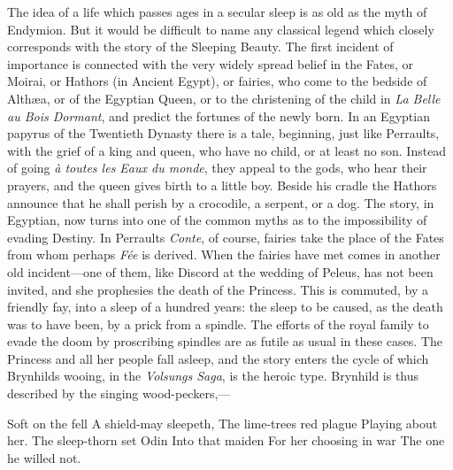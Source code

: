 \documentclass[14pt,a4paper]{memoir}
\begin{document}
{The idea of a life which passes ages in a secular sleep is as old as the
myth of Endymion. But it would be difficult to name any classical legend
which closely corresponds with the story of the Sleeping Beauty. The
first incident of importance is connected with the very widely spread
belief in the Fates, or Moirai, or Hathors (in Ancient Egypt), or
fairies, who come to the bedside of Althæa, or of the Egyptian Queen, or
to the christening of the child in \emph{La Belle au Bois Dormant}, and
predict the fortunes of the newly born. In an Egyptian papyrus of the
Twentieth Dynasty there is a tale, beginning, just like
Perrault\textquotesingle s, with the grief of a king and queen, who have
no child, or at least no son. Instead of going \emph{à toutes les Eaux
du monde}, they appeal to the gods, who hear their prayers, and the
queen gives birth to a little boy. Beside his cradle the Hathors
announce that he shall perish by a crocodile, a serpent, or a dog. The
story, in Egyptian, now turns into one of the common myths as to the
impossibility of evading
Destiny.
In Perrault\textquotesingle s \emph{Conte}, of course, fairies take the
place of the Fates from whom perhaps \emph{Fée} is derived. When the
fairies have met comes in another old incident---one of them, like
Discord at the wedding of Peleus, has not been invited, and she
prophesies the death of the Princess. This is commuted, by a friendly
fay, into a sleep of a hundred years: the sleep to be caused, as the
death was to have been, by a prick from a spindle. The efforts of the
royal family to evade the doom by proscribing spindles are as futile as
usual in these cases. The Princess and all her people fall asleep, and
the story enters the cycle of which Brynhild\textquotesingle s wooing,
in the \emph{Volsung\textquotesingle s Saga}, is the heroic type.
Brynhild is thus described by the singing wood-peckers,---

{\textquotesingle Soft on the fell} {A shield-may sleepeth,} {The
lime-trees\textquotesingle{} red plague} {Playing about her.} {The
sleep-thorn set Odin} {Into that maiden} {For her choosing in war} {The
one he willed not.\textquotesingle{}}

}
\end{document}
